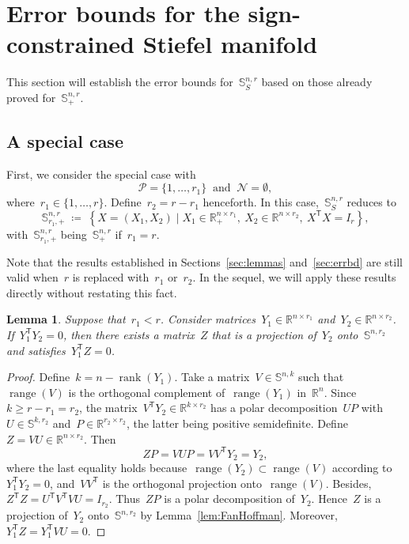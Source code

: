 \documentclass[11pt,a4paper]{article}  %
\newtheorem{lemma}{Lemma}%
\theoremstyle{definition}
\DeclareMathOperator{\rank}{rank}
\DeclareMathOperator{\range}{range}
\newcommand{\RR}{\mathbb{R}}
\newcommand{\col}{r}
\newcommand{\stf}[1]{\mathbb{S}^{#1}}
\newcommand{\trs}{{\scriptstyle{\mathsf{T}}}}
\newcommand{\tsign}{{\scriptscriptstyle{S}}}
\newcommand{\posset}{\mathcal{P}}
\newcommand{\negset}{\mathcal{N}}
\begin{document}
\section{Error bounds for the sign-constrained Stiefel manifold}
\label{sec:serrbd}

This section will establish the error bounds for~$\stf{n,\col}_\tsign$ based on those already
proved for~$\stf{n,\col}_+$.

\subsection{A special case} %

First, we consider the special case with
\begin{equation*}
    \posset = \{1, \dots, \col_1\} ~\text{ and }~ \negset = \emptyset,
\end{equation*}
where~$\col_1\in \{1, \dots, \col\}$.
Define~$\col_2 = \col-\col_1$ henceforth.
In this case,~$\stf{n,\col}_\tsign$ reduces to
\begin{equation}
    \label{eq:stfr1}
    \stf{n,\col}_{\col_1,+} \;\coloneqq\;
    \left\{ X = (X_1, X_2) \mathrel{|} X_1\in\RR^{n\times \col_1}_+, ~X_2\in\RR^{n\times \col_2},
    ~X^\trs X = I_\col \right\},
\end{equation}
with~$\stf{n,\col}_{\col_1,+}$ being~$\stf{n,\col}_+$ if~$\col_1 = \col$.



Note that the results established in Sections~\ref{sec:lemmas} and~\ref{sec:errbd}
are still valid when~$\col$ is replaced with~$\col_1$ or~$\col_2$. In the sequel, we will
apply these results directly without restating this fact.

\begin{lemma}
\label{lem:sigerrbd}
Suppose that~$\col_1<\col$.
Consider matrices~$Y_1 \in \RR^{n\times\col_1}$ and~$Y_2\in \RR^{n\times \col_2}$. If~$Y_1^\trs Y_2 = 0$,
then there exists a matrix~$Z$ that is a projection of~$Y_2$ onto~$\stf{n,\col_2}$ and
satisfies~$Y_1^\trs Z= 0$.
\end{lemma}
\begin{proof}
Define~$k = n - \rank(Y_1)$. Take a matrix~$V\in\stf{n, k}$ such that~$\range(V)$ is the orthogonal
complement of~$\range(Y_1)$ in~$\RR^n$. Since~$k \ge \col -\col_1 = \col_2$,
the matrix~$V^\trs Y_2\in\RR^{k\times \col_2}$ has a polar decomposition~$UP$
with~$U\in\stf{k, \col_2}$ and~$P\in\RR^{\col_2\times \col_2}$, the latter being positive semidefinite.
Define~$Z= VU \in\RR^{n\times \col_2}$.
Then
\[
    Z P = VUP =VV^\trs Y_2 = Y_2,
\]
where the last equality holds because~$\range(Y_2) \subset \range(V)$ according to~$Y_1^\trs Y_2 = 0$,
and~$VV^\trs$ is the orthogonal projection onto~$\range(V)$.
Besides,~$Z^\trs Z = U^\trs V^\trs VU = I_{\col_2}$. Thus~$Z P$ is a polar decomposition of~$Y_2$.
Hence~$Z$ is a projection of~$Y_2$ onto~$\stf{n,\col_2}$ by Lemma~\ref{lem:FanHoffman}.
Moreover,~$Y_1^\trs Z = Y_1^\trs VU = 0$.
\end{proof}
\end{document}
